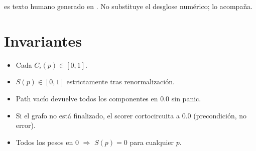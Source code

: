  es texto humano generado en
. No
substituye el desglose numérico; lo acompaña.

\section{Invariantes}

\begin{itemize}
    \item Cada $C_i(p) \in [0, 1]$.
    \item $S(p) \in [0, 1]$ estrictamente tras renormalización.
    \item Path vacío devuelve todos los componentes en 0.0 sin
    panic.
    \item Si el grafo no está finalizado, el scorer cortocircuita a
    0.0 (precondición, no error).
    \item Todos los pesos en 0 $\Rightarrow$ $S(p) = 0$ para
    cualquier $p$.
\end{itemize}
